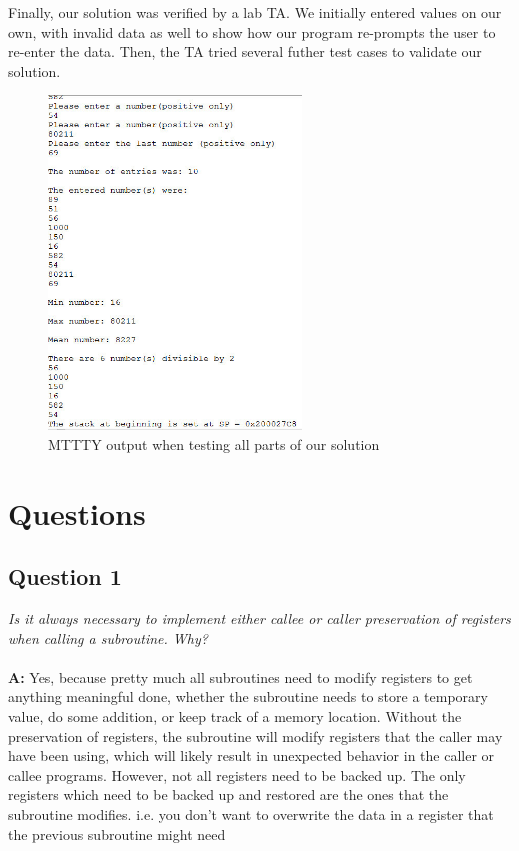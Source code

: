 \documentclass[letterpaper]{article}
\begin{document}
      Finally, our solution was verified by a lab TA. We initially entered values
      on our own, with invalid data as well to show how our
      program re-prompts the user to re-enter the data. Then, the TA tried several
      futher test cases to validate our solution.
      \begin{figure}[H]
        \centering
        \includegraphics[width=0.6\textwidth]{allparts.jpg}
        \caption{MTTTY output when testing all parts of our solution}
      \end{figure}

\section{Questions}

    \subsection{Question 1}
      \textit{Is it always necessary to implement either callee or caller preservation of registers when calling a subroutine. Why?}
      \\ \\
      \noindent\textbf{A:}
      Yes, because pretty much all subroutines need to modify registers to get anything meaningful done,
      whether the subroutine needs to store a temporary value, do some addition, or
      keep track of a memory location. Without the preservation of registers, the subroutine will
      modify registers that the caller may have been using, which will likely result
      in unexpected behavior in the caller or callee programs. However, not all registers
      need to be backed up. The only registers which need to be backed up and restored are the
      ones that the subroutine modifies.
      i.e. you don't want to overwrite the data in a register that the previous subroutine might need
\end{document}
